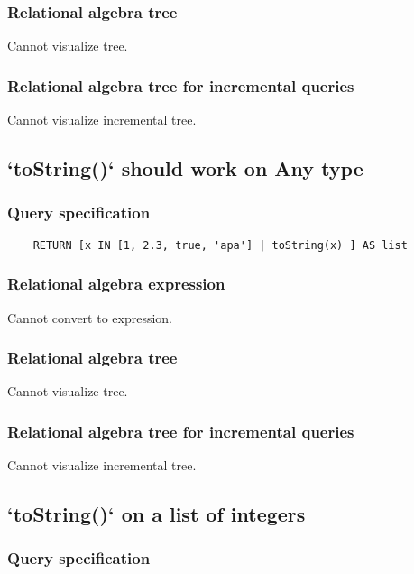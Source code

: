 	\subsubsection*{Relational algebra tree}

	Cannot visualize tree.

	\subsubsection*{Relational algebra tree for incremental queries}

	Cannot visualize incremental tree.
	\subsection{`toString()` should work on Any type}

	\subsubsection*{Query specification}

	\begin{lstlisting}
	RETURN [x IN [1, 2.3, true, 'apa'] | toString(x) ] AS list
	\end{lstlisting}


	\subsubsection*{Relational algebra expression}

	Cannot convert to expression.

	\subsubsection*{Relational algebra tree}

	Cannot visualize tree.

	\subsubsection*{Relational algebra tree for incremental queries}

	Cannot visualize incremental tree.
	\subsection{`toString()` on a list of integers}

	\subsubsection*{Query specification}


